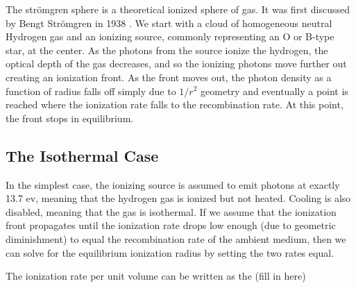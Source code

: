 The str\"omgren sphere is a theoretical ionized sphere of gas. It was first discussed by Bengt Str\"omgren in 1938 \citep{stromgren39}. We start with a cloud of homogeneous neutral Hydrogen gas and an ionizing source, commonly representing an O or B-type star, at the center. As the photons from the source ionize the hydrogen, the optical depth of the gas decreases, and so the ionizing photons move further out creating an ionization front. As the front moves out, the photon density as a function of radius falls off simply due to $1/r^2$ geometry and eventually a point is reached where the ionization rate falls to the recombination rate. At this point, the front stops in equilibrium.

%
%
%
%

\subsection{The Isothermal Case}
\label{sec:isostromgren}

In the simplest case, the ionizing source is assumed to emit photons at exactly 13.7 ev, meaning that the hydrogen gas is ionized but not heated. Cooling is also disabled, meaning that the gas is isothermal. If we assume that the ionization front propagates until the ionization rate drops low enough (due to geometric diminishment) to equal the recombination rate of the ambient medium, then we can solve for the equilibrium ionization radius by setting the two rates equal.

The ionization rate per unit volume can be written as the (fill in here)

%

